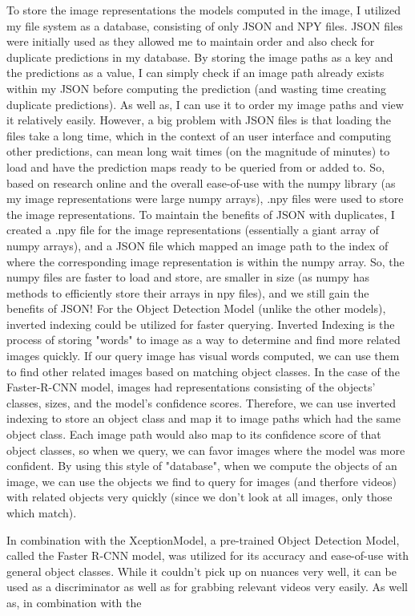 \documentclass[10pt,twocolumn]{article}
\begin{document}
To store the image representations the models computed in the image, I utilized my file system as a database, consisting of only JSON and NPY files. JSON files were initially used as they allowed me to maintain order and also check for duplicate predictions in my database. By storing the image paths as a key and the predictions as a value, I can simply check if an image path already exists within my JSON before computing the prediction (and wasting time creating duplicate predictions). As well as, I can use it to order my image paths and view it relatively easily. However, a big problem with JSON files is that loading the files take a long time, which in the context of an user interface and computing other predictions, can mean long wait times (on the magnitude of minutes) to load and have the prediction maps ready to be queried from or added to. So, based on research online \cite{} and the overall ease-of-use with the numpy library (as my image representations were large numpy arrays), .npy files were used to store the image representations. To maintain the benefits of JSON with duplicates, I created a .npy file for the image representations (essentially a giant array of numpy arrays), and a JSON file which mapped an image path to the index of where the corresponding image representation is within the numpy array. So, the numpy files are faster to load and store, are smaller in size (as numpy has methods to efficiently store their arrays in npy files), and we still gain the benefits of JSON! For the Object Detection Model (unlike the other models), inverted indexing could be utilized for faster querying. Inverted Indexing is the process of storing "words" to image as a way to determine and find more related images quickly. If our query image has visual words computed, we can use them to find other related images based on matching object classes. In the case of the Faster-R-CNN model, images had representations consisting of the objects' classes, sizes, and the model's confidence scores. Therefore, we can use inverted indexing to store an object class and map it to image paths which had the same object class. Each image path would also map to its confidence score of that object classes, so when we query, we can favor images where the model was more confident. By using this style of "database", when we compute the objects of an image, we can use the objects we find to query for images (and therfore videos) with related objects very quickly (since we don't look at all images, only those which match).

In combination with the XceptionModel, a pre-trained Object Detection Model, called the Faster R-CNN model, was utilized for its accuracy and ease-of-use with general object classes. While it couldn't pick up on nuances very well, it can be used as a discriminator as well as for grabbing relevant videos very easily. As well as, in combination with the 
\end{document}
